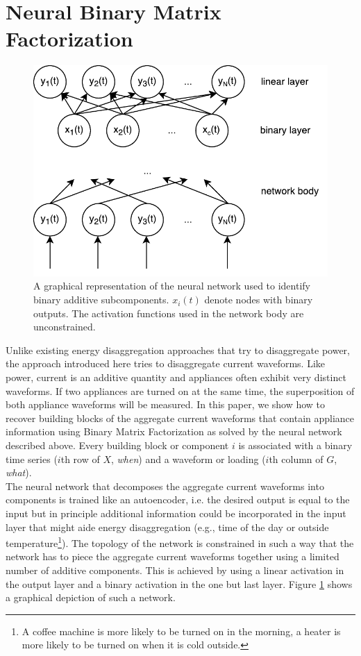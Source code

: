 \section{Neural Binary Matrix Factorization}
 \begin{figure}[!ht]
\centering
\includegraphics[width=0.75\linewidth]{bolt/neural_net.pdf}
\caption[BOLT: A graphical representation of the neural network used to identify binary additive subcomponents.]{A graphical representation of the neural network used to identify binary additive subcomponents. $x_i(t)$ denote nodes with binary outputs. The activation functions used in the network body are unconstrained.}
\label{fig_sim}
\end{figure}
Unlike existing energy disaggregation approaches that try to disaggregate power, the approach introduced here tries to disaggregate current waveforms. Like power, current is an additive quantity and appliances often exhibit very distinct waveforms. If two appliances are turned on at the same time, the superposition of both appliance waveforms will be measured. In this paper, we show how to recover building blocks of the aggregate current waveforms that contain appliance information using Binary Matrix Factorization as solved by the neural network described above. Every building block or component $i$ is associated with a binary time series ($i$th row of $X$, \emph{when}) and a waveform or loading ($i$th column of $G$, \emph{what}).\\
The neural network that decomposes the aggregate current waveforms into components is trained like an autoencoder, i.e. the desired output is equal to the input but in principle additional information could be incorporated in the input layer that might aide energy disaggregation (e.g., time of the day or outside temperature\footnote{A coffee machine is more likely to be turned on in the morning, a heater is more likely to be turned on when it is cold outside.}). The topology of the network is constrained in such a way that the network has to piece the aggregate current waveforms together using a limited number of additive components. This is achieved by using a linear activation in the output layer and a binary activation in the one but last layer. Figure \ref{fig_sim} shows a graphical depiction of such a network.\\
